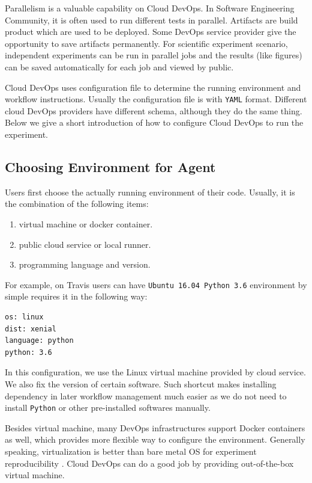 \documentclass{IEEEcsmag}
\begin{document}
Parallelism is a valuable capability on Cloud DevOps. In Software Engineering Community, it is often used to run different tests in parallel. Artifacts are build product which are used to be deployed.
Some DevOps service provider give the opportunity to save artifacts permanently. For scientific experiment scenario, independent experiments can be run in parallel jobs and the results (like figures) can be saved automatically for each job and viewed by public.

Cloud DevOps uses configuration file to determine the running environment and workflow instructions. 
Usually the configuration file is with \texttt{YAML} format. Different cloud DevOps providers have different schema, although they do the same thing. Below we give a short introduction of how to configure Cloud DevOps to run the experiment.
\subsection{Choosing Environment for Agent}
Users first choose the actually running environment of their code. Usually, it is the combination of the following items:
\begin{enumerate}
\item virtual machine or docker container.
\item public cloud service or local runner.
\item programming language and version.
\end{enumerate}

For example, on \textsf{Travis} users can have  \texttt{Ubuntu 16.04 Python 3.6} environment by simple requires it in the following way:
\begin{lstlisting}[caption={environment configuration}]
os: linux
dist: xenial
language: python
python: 3.6
\end{lstlisting}

In this configuration, we use the Linux virtual machine provided by cloud service. We also fix the version of certain software. 
Such shortcut makes installing dependency in later workflow management much easier as we do not need to install \texttt{Python} or other pre-installed softwares manually.

Besides virtual machine, many DevOps infrastructures support Docker containers as well, which provides more flexible way to configure the environment. Generally speaking, virtualization is better than bare metal OS for experiment reproducibility \cite{Howe12}. Cloud DevOps can do a good job by providing out-of-the-box virtual machine.
\end{document}
